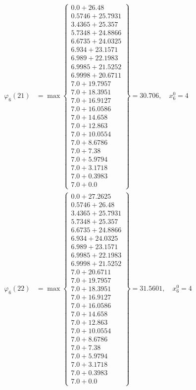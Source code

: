 \documentclass{article}
\begin{document}
\begin{align*}
  
  
  
\varphi_{6}(21) &= \max \left\{ \begin{array}{c}
0.0 + 26.48 \\
 0.5746 + 25.7931 \\
 3.4365 + 25.357 \\
 5.7348 + 24.8866 \\
 6.6735 + 24.0325 \\
 6.934 + 23.1571 \\
 6.989 + 22.1983 \\
 6.9985 + 21.5252 \\
 6.9998 + 20.6711 \\
 7.0 + 19.7957 \\
 7.0 + 18.3951 \\
 7.0 + 16.9127 \\
 7.0 + 16.0586 \\
 7.0 + 14.658 \\
 7.0 + 12.863 \\
 7.0 + 10.0554 \\
 7.0 + 8.6786 \\
 7.0 + 7.38 \\
 7.0 + 5.9794 \\
 7.0 + 3.1718 \\
 7.0 + 0.3983 \\
 7.0 + 0.0
\end{array} \right\}=30.706,\quad x_{6}^0=4\\
  
  
  
  
\varphi_{6}(22) &= \max \left\{ \begin{array}{c}
0.0 + 27.2625 \\
 0.5746 + 26.48 \\
 3.4365 + 25.7931 \\
 5.7348 + 25.357 \\
 6.6735 + 24.8866 \\
 6.934 + 24.0325 \\
 6.989 + 23.1571 \\
 6.9985 + 22.1983 \\
 6.9998 + 21.5252 \\
 7.0 + 20.6711 \\
 7.0 + 19.7957 \\
 7.0 + 18.3951 \\
 7.0 + 16.9127 \\
 7.0 + 16.0586 \\
 7.0 + 14.658 \\
 7.0 + 12.863 \\
 7.0 + 10.0554 \\
 7.0 + 8.6786 \\
 7.0 + 7.38 \\
 7.0 + 5.9794 \\
 7.0 + 3.1718 \\
 7.0 + 0.3983 \\
 7.0 + 0.0
\end{array} \right\}=31.5601,\quad x_{6}^0=4\\
  

\end{align*}
\end{document}
